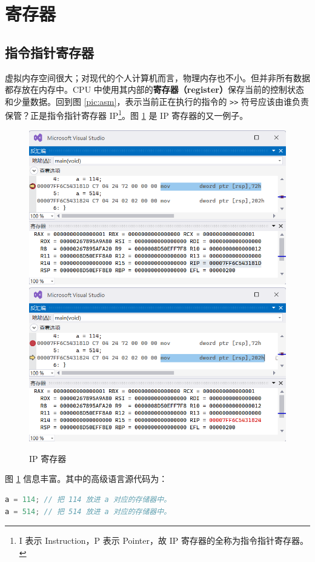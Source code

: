 
\section{寄存器}

\subsection{指令指针寄存器}

虚拟内存空间很大；对现代的个人计算机而言，物理内存也不小。但并非所有数据都存放在内存中。CPU 中使用其内部的\textbf{寄存器（register）}保存当前的控制状态和少量数据。回到图 \ref{pic:asm}，表示当前正在执行的指令的 \lstinline{>>} 符号应该由谁负责保管？正是指令指针寄存器 IP\footnote{I 表示 Instruction，P 表示 Pointer，故 IP 寄存器的全称为指令指针寄存器。}。图 \ref{pic:ip} 是 IP 寄存器的又一例子。

\begin{figure}[H]
	\centering
	\includegraphics[width=0.7\linewidth]{pic/ip-1.png}
	\includegraphics[width=0.7\linewidth]{pic/ip-2.png}
	\caption{IP 寄存器}
	\label{pic:ip}
\end{figure}

图 \ref{pic:ip} 信息丰富。其中的高级语言源代码为：

\begin{lstlisting}[language=c++, numbers=none]
a = 114; // 把 114 放进 a 对应的存储器中。
a = 514; // 把 514 放进 a 对应的存储器中。
\end{lstlisting}

